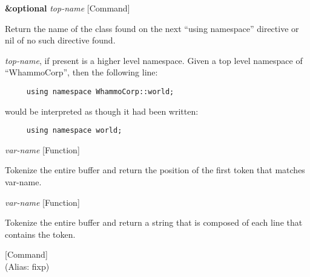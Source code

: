 \vspace{1em}
\noindent
{}
\usebox{\funcname}\textbf{\&optional} \emph{top-name}
 \hfill [Command]

\begin{doc-string}
Return the name of the class found on the next ``using namespace'' directive
or nil of no such directive found.

\emph{top-name}, if present is a higher level namespace.  Given a top level namespace
of ``WhammoCorp'', then the following line:

\small{\begin{verbatim}
     using namespace WhammoCorp::world;
\end{verbatim}}

would be interpreted as though it had been written:

\small{\begin{verbatim}
     using namespace world;
\end{verbatim}}
\end{doc-string}

\vspace{1em}
\noindent
{}
\usebox{\funcname}\emph{var-name}
 \hfill [Function]

\begin{doc-string}
Tokenize the entire buffer and return the position of the first token
that matches var-name.
\end{doc-string}

\vspace{1em}
\noindent
{}
\usebox{\funcname}\emph{var-name}
 \hfill [Function]

\begin{doc-string}
Tokenize the entire buffer and return a string that is composed of each
line that contains the token.
\end{doc-string}

\vspace{1em}
\noindent
{}
\usebox{\funcname}
 \hfill [Command]\\%
 (Alias: fixp)

